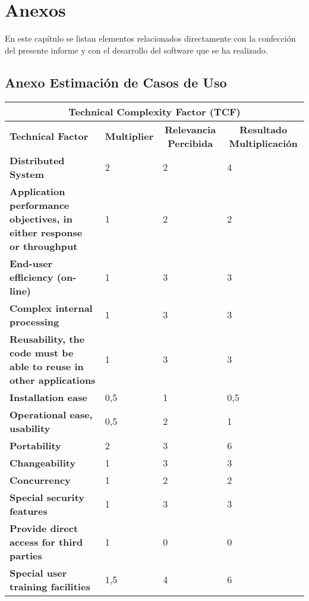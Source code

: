 \chapter{Anexos}
En este capítulo se listan elementos relacionados directamente con la confección del presente informe y con el desarrollo del software que se ha realizado.

\newpage
\section{Anexo Estimación de Casos de Uso}

\begin{center}
  \begin{tabular}{ | p{4cm} | p{2cm} | p{4cm}| p{5cm} | } 
    \hline
    \multicolumn{4}{|c|}{\textbf{Technical Complexity Factor (TCF)}} \\
    \hline
    \multicolumn{1}{|p{3cm}|}{\textbf{Technical Factor}} & \multicolumn{1}{|c|}{\textbf{Multiplier}} & \multicolumn{1}{|c|}{\textbf{Relevancia Percibida}} & \multicolumn{1}{|c|}{\textbf{Resultado Multiplicación}} \\
    \hline
    
    {\textbf{Distributed System}} & 2 & 2 & 4 \\ \hline
    {\textbf{Application performance objectives, in either response or throughput}} & 1 & 2 & 2 \\ \hline
    {\textbf{End-user efficiency (on-line)}} & 1 & 3 & 3 \\ \hline
    {\textbf{Complex internal processing}} & 1 & 3 & 3 \\ \hline
    {\textbf{Reusability, the code must be able to reuse in other applications}} & 1 & 3 & 3 \\ \hline
    {\textbf{Installation ease}} & 0,5 & 1 & 0,5 \\ \hline
    {\textbf{Operational ease, usability}} & 0,5 & 2 & 1 \\ \hline
    {\textbf{Portability}} & 2 & 3 & 6 \\ \hline
    {\textbf{Changeability}} & 1 & 3 & 3 \\ \hline
    {\textbf{Concurrency}} & 1 & 2 & 2 \\ \hline
    {\textbf{Special security features}} & 1 & 3 & 3 \\ \hline
    {\textbf{Provide direct access for third parties}} & 1 & 0 & 0 \\ \hline
    {\textbf{Special user training facilities}} & 1,5 & 4 & 6 \\ \hline
  \end{tabular}
  
  \label{table:tcf}
\end{center}

